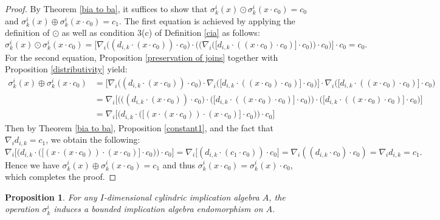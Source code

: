\documentclass[reqno]{amsart}
\theoremstyle{plain}
\newtheorem{proposition}[theorem]{Proposition}
\theoremstyle{definition}
\begin{document}
\begin{proof}
By Theorem \ref{bia to ba}, it suffices to show that $\sigma^i_k(x)\odot\sigma^i_k(x\cdot c_0)=c_0$ and $\sigma^i_k(x)\oplus\sigma^i_k(x\cdot c_0)=c_1$. The first equation is achieved by applying the definition of $\odot$ as well as condition 3(c) of Definition \ref{cia} as follows: 
\[\sigma^i_k(x)\odot\sigma^i_k(x\cdot c_0)=\biggl[\nabla_i\biggl((d_{i,k}\cdot(x\cdot c_0))\cdot c_0\biggl)\cdot\biggl(\biggl(\nabla_i\biggl(\bigl[d_{i,k}\cdot((x\cdot c_0)\cdot c_0)\bigl]\cdot c_0\biggl)\biggl)\cdot c_0\biggl)\biggl]\cdot c_0=c_0.\] For the second equation, Proposition \ref{preservation of joins} together with Proposition \ref{distributivity} yield:  
\begin{align*}
    \sigma^i_k(x)\oplus\sigma^i_k(x\cdot c_0)&=\biggl[\nabla_i\biggl((d_{i,k}\cdot(x\cdot c_0))\cdot c_0\biggl)\cdot\nabla_i\biggl(\bigl[d_{i,k}\cdot((x\cdot c_0)\cdot c_0)\bigl]\cdot c_0\biggl)  \biggl]\cdot\nabla_i\biggl(\bigl[d_{i,k}\cdot((x\cdot c_0)\cdot c_0)\bigl]\cdot c_0\biggl) 
    \\&=\nabla_i\biggl[\biggl(\biggl((d_{i,k}\cdot(x\cdot c_0))\cdot c_0\biggl)\cdot\biggl(\bigl[d_{i,k}\cdot((x\cdot c_0)\cdot c_0)\bigl]\cdot c_0\biggl)  \biggl)\cdot\biggl(\bigl[d_{i,k}\cdot((x\cdot c_0)\cdot c_0)\bigl]\cdot c_0\biggl)\biggl] 
    \\&=\nabla_i\biggl[\biggl(d_{i,k}\cdot\biggl(\bigl[(x\cdot (x\cdot c_0))\cdot(x\cdot c_0)\bigl]\cdot c_0\biggl)\biggl)\cdot c_0\biggl]
\end{align*}
Then by Theorem \ref{bia to ba}, Proposition \ref{constant1}, and the fact that $\nabla_id_{i,k}=c_1$, we obtain the following:  
\[\nabla_i\biggl[\biggl(d_{i,k}\cdot\biggl(\bigl[(x\cdot (x\cdot c_0))\cdot(x\cdot c_0)\bigl]\cdot c_0\biggl)\biggl)\cdot c_0\biggl]=\nabla_i\bigl[(d_{i,k}\cdot(c_1\cdot c_0))\cdot c_0\bigl]=\nabla_i((d_{i,k}\cdot c_0)\cdot c_0)=\nabla_id_{i,k}=c_1.\]
Hence we have $\sigma^i_k(x)\oplus\sigma^i_k(x\cdot c_0)=c_1$ and thus $\sigma^i_k(x\cdot c_0)=\sigma^i_k(x)\cdot c_0$, which completes the proof. 
\end{proof}
\begin{proposition}\label{endomorphism}
    For any $I$-dimensional cylindric implication algebra $A$, the operation $\sigma^i_k$ induces a bounded implication algebra endomorphism on $A$. 
\end{proposition}
\end{document}
